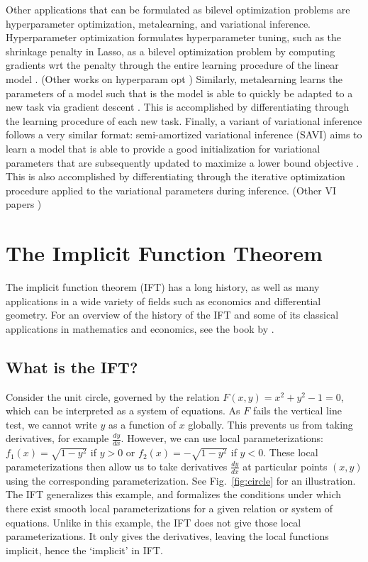 \documentclass[11pt]{article}
\begin{document}
Other applications that can be formulated as bilevel optimization problems are
hyperparameter optimization, metalearning, and variational inference.
Hyperparameter optimization formulates hyperparameter tuning, such as the shrinkage penalty in Lasso,
as a bilevel optimization problem by computing gradients wrt the penalty through the entire learning procedure
of the linear model \citep{lorraine2019implasso}.
(Other works on hyperparam opt \citep{maclaurin2015reversible,bertrand2020implicit})
Similarly, metalearning learns the parameters of a model such that is the model is able to quickly
be adapted to a new task via gradient descent \citep{finn2017maml,rajeswaran2019imaml}.
This is accomplished by differentiating through the learning procedure of each new task.
Finally, a variant of variational inference follows a very similar format:
semi-amortized variational inference (SAVI) aims to learn a model that is able to provide
a good initialization for variational parameters that are subsequently updated
to maximize a lower bound objective \citep{kim2018savi}.
This is also accomplished by differentiating through the iterative optimization procedure
applied to the variational parameters during inference.
(Other VI papers \citep{vi,johnson2017pgm})

\section{The Implicit Function Theorem}
The implicit function theorem (IFT) has a long history, as well as many applications
in a wide variety of fields such as economics and differential geometry.
For an overview of the history of the IFT and some of its classical applications
in mathematics and economics,
see the book by \citet{iftbook}.

\subsection{What is the IFT?}
Consider the unit circle,
governed by the relation $F(x,y) = x^2 + y^2 - 1 = 0$,
which can be interpreted as a system of equations.
As $F$ fails the vertical line test, we cannot write $y$ as a function of $x$ globally.
This prevents us from taking derivatives, for example $\frac{dy}{dx}$.
However, we can use local parameterizations: $f_1(x) = \sqrt{1-y^2}$ if $y > 0$
or $f_2(x) = -\sqrt{1-y^2}$ if $y<0$.
These local parameterizations then allow us to take derivatives $\frac{dy}{dx}$
at particular points $(x,y)$ using the corresponding parameterization.
See Fig.~\ref{fig:circle} for an illustration.
The IFT generalizes this example, and formalizes the conditions under which there exist
smooth local parameterizations for a given relation or system of equations.
Unlike in this example, the IFT does not give those local parameterizations.
It only gives the derivatives, leaving the local functions implicit,
hence the `implicit' in IFT.
\end{document}
